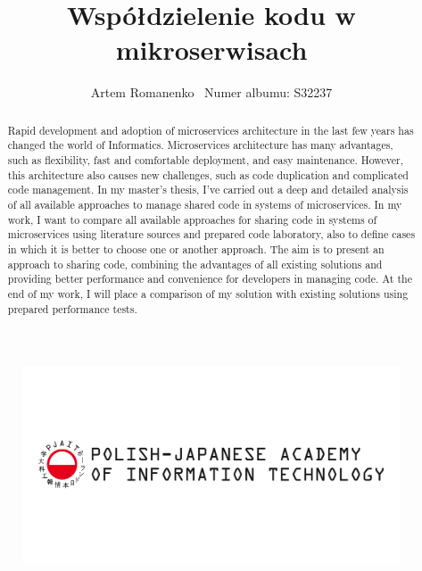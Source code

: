\documentclass[runningheads,12pt]{llncs}
\begin{document}
\title{Współdzielenie kodu w mikroserwisach} \subtitle{}

\author{Artem Romanenko \ Numer albumu: S32237 \inst{}}
\authorrunning{ }

\maketitle

\thispagestyle{fancy}

\begin{figure}[t!]
    \centering
    \includegraphics[width=\linewidth]{images/Logo_EN_1.png}
    \label{fig:my_label}
\end{figure}


\clearpage

\makeatletter
\renewcommand*\l@author[2]{}
\renewcommand*\l@title[2]{}
\makeatletter

\begin{abstract}
Rapid development and adoption of microservices architecture in the last few years has changed the world of Informatics. Microservices architecture has many advantages, such as flexibility, fast and comfortable deployment, and easy maintenance. However, this architecture also causes new challenges, such as code duplication and complicated code management. In my master's thesis, I've carried out a deep and detailed analysis of all available approaches to manage shared code in systems of microservices. In my work, I want to compare all available approaches for sharing code in systems of microservices using literature sources and prepared code laboratory, also to define cases in which it is better to choose one or another approach. The aim is to present an approach to sharing code, combining the advantages of all existing solutions and providing better performance and convenience for developers in managing code. At the end of my work, I will place a comparison of my solution with existing solutions using prepared performance tests.
\end{abstract}
\end{document}
